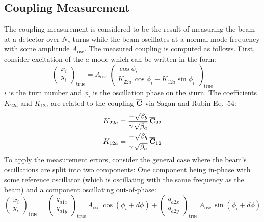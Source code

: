 \subsection{Coupling Measurement}
\label{Coupling!measurement}

The coupling measurement is considered to be the result of measuring
the beam at a detector over $N_s$ turns while the beam oscillates at a
normal mode frequency with some amplitude $A_{\text{osc}}$.  The
measured coupling is computed as follows. First, consider excitation
of the $a$-mode which can be written in the form:
\begin{equation}
  \begin{pmatrix}
    x_i \\
    y_i
  \end{pmatrix}_{\! \text{true}}
  =
  A_{\text{osc}} \,
  \begin{pmatrix}
    \cos \phi_i \\
    K_{22a} \, \cos \phi_i + K_{12a} \sin \phi_i
  \end{pmatrix}_{\! \text{true}}
  \label{xyapk}
\end{equation}
$i$ is the turn number and $\phi_i$ is the oscillation phase on the $i$\Th turn.
The coefficients $K_{22a}$ and $K_{12a}$ are related to the coupling $\overline{{\bf C}}$ via
Sagan and Rubin\cite{b:coupling} Eq.~54:
\begin{alignat}{1}
  K_{22a} &= \frac{-\sqrt{\beta_b}}{\gamma \, \sqrt{\beta_a}} \, \overline{{\bf C}}_{22} \nonumber \\
  K_{12a} &= \frac{-\sqrt{\beta_b}}{\gamma \, \sqrt{\beta_a}} \, \overline{{\bf C}}_{12}
  \label{kabgbc}
\end{alignat}
To apply the measurement errors, consider the general case where the
beam's oscillations are split into two components: One component being
in-phase with some reference oscillator (which is oscillating with the
same frequency as the beam) and a component oscillating out-of-phase:
\begin{equation}
  \begin{pmatrix}
    x_i \\
    y_i
  \end{pmatrix}_{\! \text{true}}
  =
  \begin{pmatrix}
    q_{a1x} \\
    q_{a1y}
  \end{pmatrix}_{\! \text{true}}
  \, A_{\text{osc}} \, \cos (\phi_i + d\phi) +
  \begin{pmatrix}
    q_{a2x} \\
    q_{a2y}
  \end{pmatrix}_{\! \text{true}}
  \, A_{\text{osc}} \, \sin (\phi_i + d\phi)
  \label{xykkap}
\end{equation}

